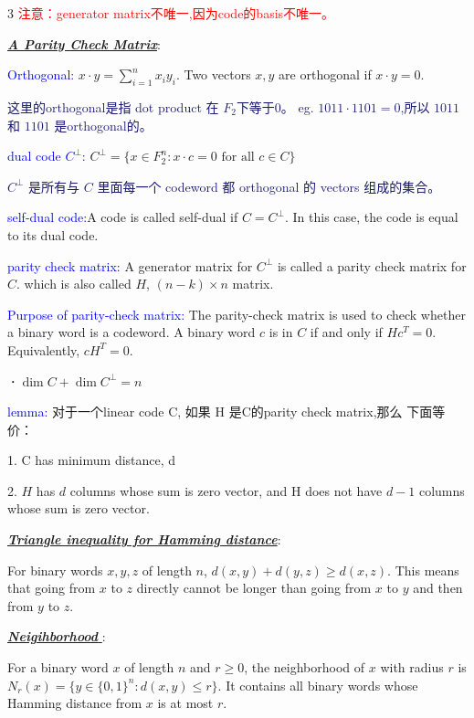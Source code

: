 \documentclass[12pt]{article}
\newcommand{\bulletPoint}[1]{\underline{\textit{\textbf{#1}}}}
\begin{document}
\begin{multicols*}{3}
\textcolor{red}{注意：generator matrix不唯一,因为code的basis不唯一。}

\bulletPoint{A Parity Check Matrix}:

\textcolor{blue}{Orthogonal:}  $x\cdot y =\sum_{i=1}^{n} x_i y_i$. Two vectors $x,y$ are orthogonal if $x\cdot y=0$. 

{\fontsize{5.5pt}{5pt}\selectfont\textcolor{MidnightBlue}{这里的orthogonal是指 dot product 在 $F_2$下等于0。
 eg. $1011· 1101=0$,所以 $1011$ 和 $1101$ 是orthogonal的。}}

\textcolor{blue}{dual code $C^\perp$:} $C^\perp=\{x\in F_2^n: x\cdot c=0\text{ for all }c\in C\}$

{\fontsize{5.5pt}{5pt}\selectfont\textcolor{MidnightBlue}{$C^\perp$ 是所有与  $C$ 里面每一个 codeword 都 orthogonal 的 vectors 组成的集合。}}

\textcolor{blue}{self-dual code:}A code is called self-dual if $ C=C^\perp. $ In this case, the code is equal to its dual code.

\textcolor{blue}{parity check matrix:} A generator matrix for $C^\perp$ 
is called a parity check matrix for $C$. which is also called \textcolor{magenta!90!black}{$H$,  $(n-k) \times n$ matrix}.

\textcolor{blue}{Purpose of parity-check matrix:}
    The parity-check matrix is used to check whether a binary word is a codeword.
    A binary word $c$ is in $C$ if and only if \textcolor{magenta!90!black}{$
    Hc^T=0.$}
    Equivalently,
    \textcolor{magenta!90!black}{$
    cH^T=0.
    $}

\textbf{·}$\dim C + \dim C^\perp = n$

\textcolor{blue}{lemma:} 对于一个linear code C, 如果 H 是C的parity check matrix,那么 下面等价：

1. C has minimum distance, d

2. $H$ has $d$ columns whose sum is zero vector, and H does not have $d-1$ columns whose sum is zero vector.

\bulletPoint{Triangle inequality for Hamming distance}:

For binary words $x,y,z$ of length $n$, $d(x,y)+d(y,z)\ge d(x,z).$
This means that going from $x$ to $z$ directly cannot be longer than going from $x$ to $y$ and then from $y$ to $z$.

\bulletPoint{Neigihborhood }:

 For a binary word $x$ of length $n$ and $r\ge 0$, the neighborhood of $x$ with radius $r$ is $
    N_r(x)=\{y\in \{0,1\}^n:d(x,y)\le r\}. $
It contains all binary words whose Hamming distance from $x$ is at most $r$.


\end{multicols*}
\end{document}
